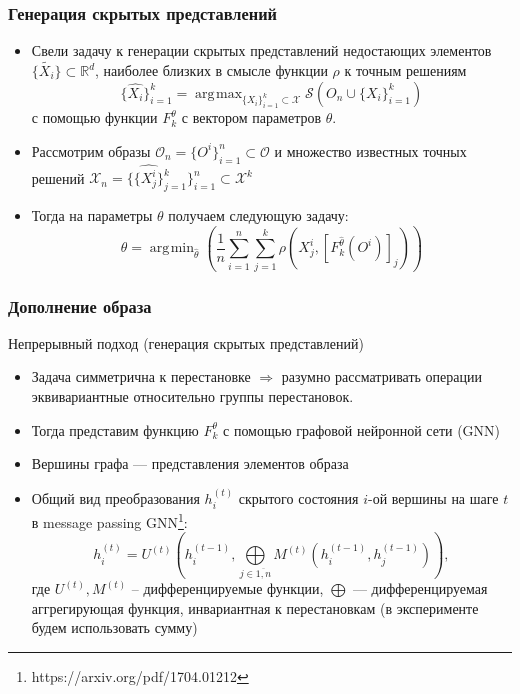 \documentclass[10pt]{beamer}
\DeclareMathOperator*{\argmax}{\arg\!\max}
\DeclareMathOperator*{\argmin}{\arg\!\min}
\begin{document}
\begin{frame}
	\frametitle{Генерация скрытых представлений}
		\begin{itemize}
			\item Свели задачу к генерации скрытых представлений недостающих элементов $\{\tilde{X_i}\}\subset \mathbb{R}^d$, наиболее близких в смысле функции $\rho$ к точным решениям
			$$\{\hat{X_i}\}_{i=1}^k= \argmax_{\{X_i\}_{i=1}^k\subset\mathcal{X}} \mathcal{S}\left(O_n\cup\{X_i\}_{i=1}^k\right)$$
			с помощью функции  $F_k^\theta$ с вектором параметров $\theta$. 
			\item Рассмотрим образы $\mathcal{O}_n = \{O^i\}_{i=1}^n \subset\mathcal{O}$ и множество известных точных решений $\mathcal{X}_n =\{\{\hat{X_j^i}\}_{j=1}^k\}_{i=1}^n\subset\mathcal{X}^k$
			\item Тогда на параметры $\theta$ получаем следующую задачу:
			$$\theta = \argmin_{\hat{\theta}}\left( \frac{1}{n}\sum_{i=1}^n\sum_{j=1}^k\rho\left(X_j^i, [F_k^{\hat{\theta}}(O^i)]_j\right)\right)$$
		\end{itemize}
\end{frame}


\begin{frame}
	\frametitle{Дополнение образа}
	\begin{block}{Непрерывный подход (генерация скрытых представлений)}
		\begin{itemize}
			\item  Задача симметрична к перестановке $\Longrightarrow$ разумно рассматривать операции эквивариантные относительно группы перестановок.
			\item Тогда представим функцию $F_k^\theta$ с помощью графовой нейронной сети (GNN)
			\item Вершины графа --- представления элементов образа
			\item Общий вид преобразования $h_i^{(t)}$ скрытого состояния $i$-ой вершины на шаге $t$ в message passing GNN\footnote{https://arxiv.org/pdf/1704.01212}:
			$$h_i^{(t)} = U^{(t)} \left(h_i^{(t-1)}, \bigoplus\limits_{j\in \overline{1, n}}M^{(t)} \left(h_i^{(t-1)}, h_j^{(t-1)} \right) \right),$$
			где $U^{(t)}, M^{(t)}$ -- дифференцируемые функции, $\bigoplus$ --- дифференцируемая аггрегирующая функция, инвариантная к перестановкам (в эксперименте будем использовать сумму)
		\end{itemize}
	\end{block}
\end{frame}
\end{document}
